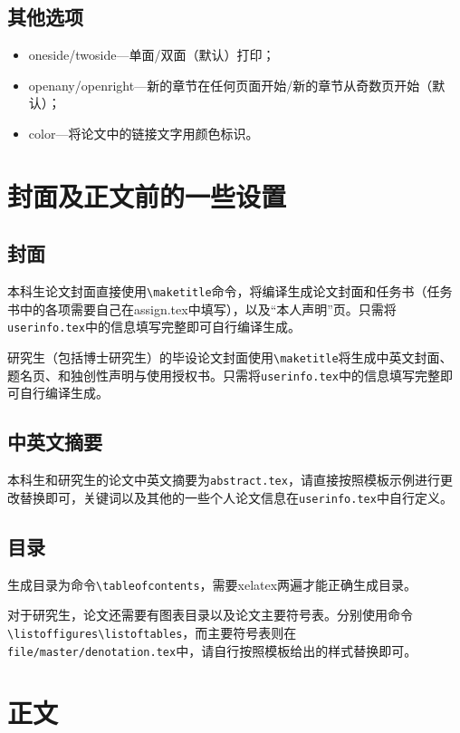 \subsection{其他选项}
    \begin{itemize}
        \item oneside\slash twoside---单面\slash 双面（默认）打印；
        \item openany\slash openright---新的章节在任何页面开始\slash 新的章节从奇数页开始（默认）；
        \item color---将论文中的链接文字用颜色标识。
    \end{itemize}

\section{封面及正文前的一些设置}
\subsection{封面}
本科生论文封面直接使用\texttt{\textbackslash maketitle}命令，将编译生成论文封面和任务书（任务书中的各项需要自己在assign.tex中填写），以及“本人声明”页。只需将\texttt{userinfo.tex}中的信息填写完整即可自行编译生成。

研究生（包括博士研究生）的毕设论文封面使用\texttt{\textbackslash maketitle}将生成中英文封面、题名页、和独创性声明与使用授权书。只需将\texttt{userinfo.tex}中的信息填写完整即可自行编译生成。

\subsection{中英文摘要}
本科生和研究生的论文中英文摘要为\texttt{abstract.tex}，请直接按照模板示例进行更改替换即可，关键词以及其他的一些个人论文信息在\texttt{userinfo.tex}中自行定义。
\subsection{目录}
生成目录为命令\texttt{\textbackslash tableofcontents}，需要xelatex两遍才能正确生成目录。

对于研究生，论文还需要有图表目录以及论文主要符号表。分别使用命令\texttt{\textbackslash listoffigures}\texttt{\textbackslash listoftables}，而主要符号表则在\texttt{file/master/denotation.tex}中，请自行按照模板给出的样式替换即可。

\section{正文}
